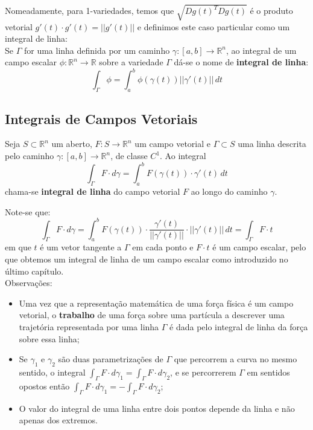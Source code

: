 \documentclass{article}
\newcommand{\R}{\mathbb{R}}
\begin{document}
Nomeadamente, para 1-variedades, temos que $\sqrt{Dg(t)^T Dg(t)}$ é o produto vetorial $g'(t) \cdot g'(t) = ||g'(t)||$ e definimos este caso particular como um integral de linha:\\
Se $\Gamma$ for uma linha definida por um caminho $\gamma : [a,b] \to \R^n$, ao integral de um campo escalar $\phi : \R^n \to \R$ sobre a variedade $\Gamma$ dá-se o nome de \textbf{integral de linha}:
$$ \int_\Gamma \phi = \int_a^b \phi(\gamma(t)) || \gamma'(t) || \, dt $$

\subsection{Integrais de Campos Vetoriais}
Seja $S \subset \R^n$ um aberto, $F: S \to \R^n$ um campo vetorial e $\Gamma \subset S$ uma linha descrita pelo caminho $\gamma: [a,b] \to \R^n$, de classe $C^1$. Ao integral
$$ \int_\Gamma F \cdot d\gamma = \int_a^b F(\gamma(t))\cdot \gamma '(t) \, dt$$
chama-se \textbf{integral de linha} do campo vetorial $F$ ao longo do caminho $\gamma$.

Note-se que:
$$ \int_\Gamma F \cdot d\gamma = \int_a^b F(\gamma(t))\cdot \frac{\gamma'(t)}{||\gamma'(t)||} \cdot ||\gamma'(t)|| \, dt = \int_\Gamma F\cdot t  $$
em que $t$ é um vetor tangente a $\Gamma$ em cada ponto e $F \cdot t$ é um campo escalar, pelo que obtemos um integral de linha de um campo escalar como introduzido no último capítulo.\\ 

\newpage
Observações:
\begin{itemize}
	\item Uma vez que a representação matemática de uma força física é um campo vetorial, o \textbf{trabalho} de uma força sobre uma partícula a descrever uma trajetória representada por uma linha $\Gamma$ é dada pelo integral de linha da força sobre essa linha; 
	\item Se $\gamma_1$ e $\gamma_2$ são duas parametrizações de $\Gamma$ que percorrem a curva no mesmo sentido, o integral $\int_\Gamma F \cdot d\gamma_1 = \int_\Gamma F \cdot d\gamma_2$, e se percorrerem $\Gamma$ em sentidos opostos então $\int_\Gamma F \cdot d\gamma_1 = -\int_\Gamma F \cdot d\gamma_2$; 
	\item O valor do integral de uma linha entre dois pontos depende da linha e não apenas dos extremos.
\end{itemize}
\end{document}
